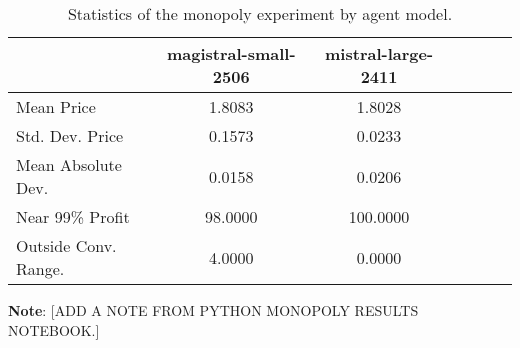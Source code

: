 \begin{table}[H]
\centering
\caption{Statistics of the monopoly experiment by agent model.}
\label{tab:monopoly_stats}
\begin{tabular}{lcccccc}
\toprule
 & magistral-small-2506 & mistral-large-2411 \\
\midrule
Mean Price & 1.8083 & 1.8028 \\
Std. Dev. Price & 0.1573 & 0.0233 \\
Mean Absolute Dev. & 0.0158 & 0.0206 \\
Near 99\% Profit & 98.0000 & 100.0000 \\
Outside Conv. Range. & 4.0000 & 0.0000 \\
\bottomrule
\end{tabular}

\vspace{0.5em}
\footnotesize{\parbox{1\textwidth}{\textbf{Note}: [ADD A NOTE FROM PYTHON MONOPOLY RESULTS NOTEBOOK.]}}

\end{table}
